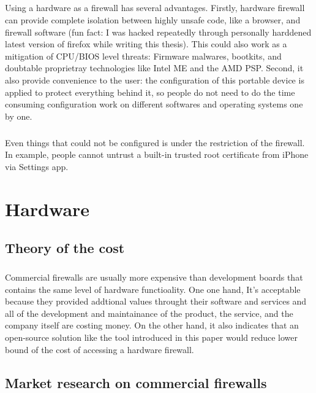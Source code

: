 \documentclass[mscthesis]{usiinfthesis}
\begin{document}
\paragraph{}
Using a hardware as a firewall has several advantages. Firstly, hardware
firewall can provide complete isolation between highly unsafe code,
like a browser, and firewall software (fun fact: I was hacked repeatedly
through personally harddened latest version of firefox while writing this
thesis). This could also work as a mitigation of CPU/BIOS level threats:
Firmware malwares, bootkits, and doubtable proprietray technologies like
Intel ME and the AMD PSP. Second, it also provide convenience to the
user: the configuration of this portable device is applied to protect
everything behind it, so people do not need to do the time consuming
configuration work on different softwares and operating systems one by one.
\paragraph{}
Even things that could not be configured is under the restriction of the firewall. In example, people cannot untrust a built-in trusted root certificate from iPhone via Settings app.

\chapter{Hardware}
\section{Theory of the cost}
\paragraph{}
Commercial firewalls are usually more expensive than development boards that contains the same level of hardware functioality. One one hand, It's acceptable because they provided addtional values throught their software and services and all of the development and maintainance of the product, the service, and the company itself are costing money. On the other hand, it also indicates that an open-source solution like the tool introduced in this paper would reduce lower bound of the cost of accessing a hardware firewall.
\section{Market research on commercial firewalls}
\end{document}
